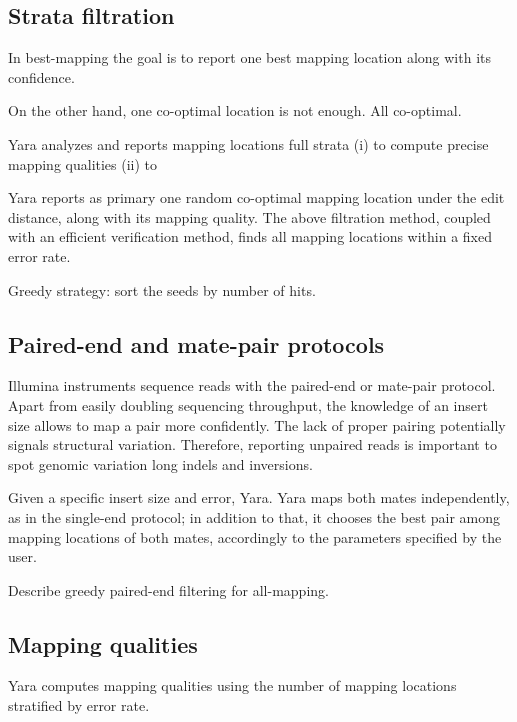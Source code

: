 \subsection{Strata filtration}

In best-mapping the goal is to report one best mapping location along with its confidence.

On the other hand, one co-optimal location is not enough.
All co-optimal.

Yara analyzes and reports mapping locations full strata
(i) to compute precise mapping qualities
(ii) to 

Yara reports as primary one random co-optimal mapping location under the edit distance, along with its mapping quality.
The above filtration method, coupled with an efficient verification method, finds all mapping locations within a fixed error rate.

Greedy strategy: sort the seeds by number of hits.

\subsection{Paired-end and mate-pair protocols}

Illumina instruments sequence reads with the paired-end or mate-pair protocol.
Apart from easily doubling sequencing throughput, the knowledge of an insert size allows to map a pair more confidently.
The lack of proper pairing potentially signals structural variation.
Therefore, reporting unpaired reads is important to spot genomic variation \eg long indels and inversions.

Given a specific insert size and error, Yara.
Yara maps both mates independently, as in the single-end protocol; in addition to that, it chooses the best pair among mapping locations of both mates, accordingly to the parameters specified by the user.



Describe greedy paired-end filtering for all-mapping.

\subsection{Mapping qualities}

Yara computes mapping qualities using the number of mapping locations stratified by error rate.


